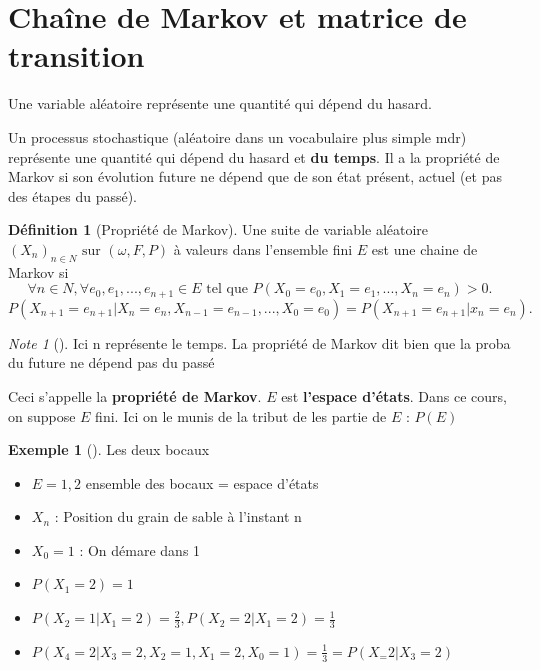 \documentclass{article}
\theoremstyle{plain}%
\theoremstyle{definition}
\newtheorem{defn}{Définition}[section]
\newtheorem{exmp}{Exemple}[section]
\theoremstyle{remark}
\newtheorem*{note}{Note}
\begin{document}
\section{Chaîne de Markov et matrice de transition}

	Une variable aléatoire représente une quantité qui dépend du hasard.
	
	Un processus stochastique (aléatoire dans un vocabulaire plus simple mdr) représente une quantité qui dépend du hasard et \textbf{du temps}. Il a la propriété de Markov si son évolution future ne dépend que de son état présent, actuel (et pas des étapes du passé).

	\begin{defn}[Propriété de Markov]
		Une suite de variable aléatoire  $ (X_n)_{n \in N} \text{ sur } (\omega , F, P)$ à valeurs dans l'ensemble fini  $ E $ est une chaine de Markov si 
		\[
			\forall n \in N, \forall e_0, e_1, ..., e_{n+1} \in E \text{ tel que } P(X_0 = e_0, X_1=e_1, ..., X_n=e_n) > 0
		.\]
		\[
			P(X_{n+1} = e_{n+1} | X_n = e_n, X_{n-1}=e_{n-1}, ..., X_0=e_0) = P(X_{n+1} = e_{n+1}|x_n=e_n)
		.\]
		
		\begin{note}[]
			Ici n représente le temps. La propriété de Markov dit bien que la proba du future ne dépend pas du passé
		\end{note}
		
		Ceci s'appelle la \textbf{propriété de Markov}.  $ E $ est \textbf{l'espace d'états}. Dans ce cours, on suppose $ E $ fini. Ici on le munis de la tribut de les partie de $ E $ : $ P(E) $ 		
	\end{defn}

	\begin{exmp}[]
		Les deux bocaux \\
		\begin{itemize}
			\item $E={1,2}$ ensemble des bocaux = espace d'états
			\item $ \displaystyle X_n $ : Position du grain de sable à l'instant n
			\item $ \displaystyle X_0 = 1 $ : On démare dans 1
			\item $ \displaystyle P(X_1=2) = 1$
			\item $ \displaystyle P(X_2=1 | X_1 =2) = \frac{2}{3}, P(X_2=2 | X_1=2) = \frac{1}{3} $ 
			\item $ \displaystyle P(X_4=2 | X_3=2, X_2=1,X_1=2,X_0=1) = \frac{1}{3} = P(X_=2 | X_3 = 2)$
		\end{itemize}
	\end{exmp}
\end{document}
